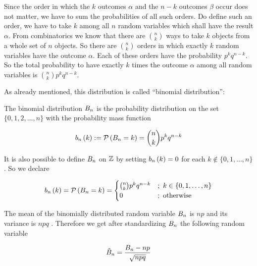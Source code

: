 Since the order in which the $k$ outcomes $\alpha$ and the $n-k$ outcomes $\beta$ occur does not matter, we have to sum the probabilities of all such orders. Do define such an order, we have to take $k$ among all $n$ random variables which shall have the result $\alpha$. From combinatorics we know that there are $\binom nk$ ways to take $k$ objects from a whole set of $n$ objects. So there are $\binom nk$ orders in which exactly $k$ random variables have the outcome $\alpha$. Each of these orders have the probability $p^kq^{n-k}$. So the total probability to have exactly $k$ times the outcome $\alpha$ among all random variables is $\binom nk p^kq^{n-k}$.

As already mentioned, this distribution is called ``binomial distribution'':

\begin{definition}
  The binomial distribution $\Bs$ is the probability distribution on the set $\{0,1,2,\ldots,n\}$ with the probability mass function

  \begin{align}
      \b{k}:=\P{\Bs=k} = \binom nk p^k q^{n-k}
  \end{align}
\end{definition}

It is also possible to define $\Bs$ on $\Z$ by setting $\b{k}=0$ for each $k\notin \{0,1,\ldots,n\}$. So we declare

\begin{align}
\b[n]{k} = \P{\Bs[n] = k} = \begin{cases} \binom nk p^k q^{n-k} & ;\ k \in \{0,1,\ldots,n\} \\ 0 & ;\  \text{otherwise} \end{cases}
\end{align}



The mean of the binomially distributed random variable $\Bs[n]$ is $np$ and its variance is $npq$ \cite[p. 112]{georgii}\cite[pp. 8-9]{fels}\cite{wiki:binomial_distribution}. Therefore we get after standardizing $\Bs[n]$ the following random variable

\begin{align}
  \BBs[n] = \frac{\Bs[n]-np}{\sqrt{npq}}
\end{align}

